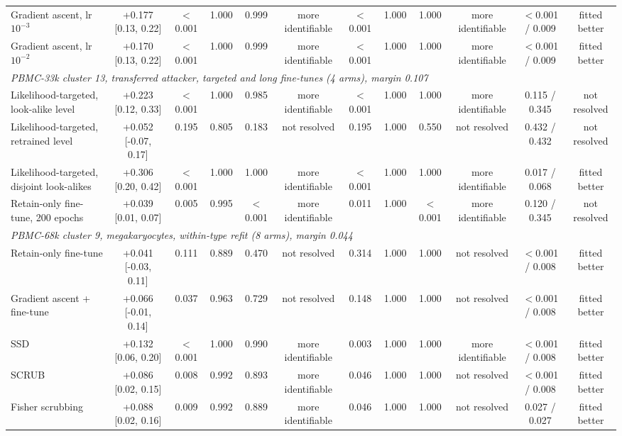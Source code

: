 \begin{tabular}{lccccccccccc}
Gradient ascent, lr $10^{-3}$ & +0.177 [0.13, 0.22] & $<$0.001 & 1.000 & 0.999 & more identifiable & $<$0.001 & 1.000 & 1.000 & more identifiable & $<$0.001 / 0.009 & fitted better \\
Gradient ascent, lr $10^{-2}$ & +0.170 [0.13, 0.22] & $<$0.001 & 1.000 & 0.999 & more identifiable & $<$0.001 & 1.000 & 1.000 & more identifiable & $<$0.001 / 0.009 & fitted better \\
\midrule
\multicolumn{12}{l}{\emph{PBMC-33k cluster 13, transferred attacker, targeted and long fine-tunes (4 arms), margin 0.107}} \\
Likelihood-targeted, look-alike level & +0.223 [0.12, 0.33] & $<$0.001 & 1.000 & 0.985 & more identifiable & $<$0.001 & 1.000 & 1.000 & more identifiable & 0.115 / 0.345 & not resolved \\
Likelihood-targeted, retrained level & +0.052 [-0.07, 0.17] & 0.195 & 0.805 & 0.183 & not resolved & 0.195 & 1.000 & 0.550 & not resolved & 0.432 / 0.432 & not resolved \\
Likelihood-targeted, disjoint look-alikes & +0.306 [0.20, 0.42] & $<$0.001 & 1.000 & 1.000 & more identifiable & $<$0.001 & 1.000 & 1.000 & more identifiable & 0.017 / 0.068 & fitted better \\
Retain-only fine-tune, 200 epochs & +0.039 [0.01, 0.07] & 0.005 & 0.995 & $<$0.001 & more identifiable & 0.011 & 1.000 & $<$0.001 & more identifiable & 0.120 / 0.345 & not resolved \\
\midrule
\multicolumn{12}{l}{\emph{PBMC-68k cluster 9, megakaryocytes, within-type refit (8 arms), margin 0.044}} \\
Retain-only fine-tune & +0.041 [-0.03, 0.11] & 0.111 & 0.889 & 0.470 & not resolved & 0.314 & 1.000 & 1.000 & not resolved & $<$0.001 / 0.008 & fitted better \\
Gradient ascent + fine-tune & +0.066 [-0.01, 0.14] & 0.037 & 0.963 & 0.729 & not resolved & 0.148 & 1.000 & 1.000 & not resolved & $<$0.001 / 0.008 & fitted better \\
SSD & +0.132 [0.06, 0.20] & $<$0.001 & 1.000 & 0.990 & more identifiable & 0.003 & 1.000 & 1.000 & more identifiable & $<$0.001 / 0.008 & fitted better \\
SCRUB & +0.086 [0.02, 0.15] & 0.008 & 0.992 & 0.893 & more identifiable & 0.046 & 1.000 & 1.000 & not resolved & $<$0.001 / 0.008 & fitted better \\
Fisher scrubbing & +0.088 [0.02, 0.16] & 0.009 & 0.992 & 0.889 & more identifiable & 0.046 & 1.000 & 1.000 & not resolved & 0.027 / 0.027 & fitted better \\

\end{tabular}
